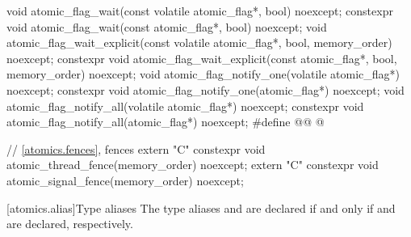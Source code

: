 \begin{codeblock}
{  void atomic_flag_wait(const volatile atomic_flag*, bool) noexcept;
  constexpr void atomic_flag_wait(const atomic_flag*, bool) noexcept;
  void atomic_flag_wait_explicit(const volatile atomic_flag*, bool, memory_order) noexcept;
  constexpr void atomic_flag_wait_explicit(const atomic_flag*, bool, memory_order) noexcept;
  void atomic_flag_notify_one(volatile atomic_flag*) noexcept;
  constexpr void atomic_flag_notify_one(atomic_flag*) noexcept;
  void atomic_flag_notify_all(volatile atomic_flag*) noexcept;
  constexpr void atomic_flag_notify_all(atomic_flag*) noexcept;
  #define @@ @\seebelownc@

  // \ref{atomics.fences}, fences
  extern "C" constexpr void atomic_thread_fence(memory_order) noexcept;
  extern "C" constexpr void atomic_signal_fence(memory_order) noexcept;
}
\end{codeblock}

[atomics.alias]{Type aliases}
%
%
%
%
%
%
%
%
%
%
%
%
%
%
%
%
%
%
%
%
%
%
%
%
%
%
%
%
%
%
%
%
%
%
%
%
%
%
%
%
%
%
%
%
%
%
\pnum
The type aliases  and 
are declared if and only if
 and 
are declared, respectively.

